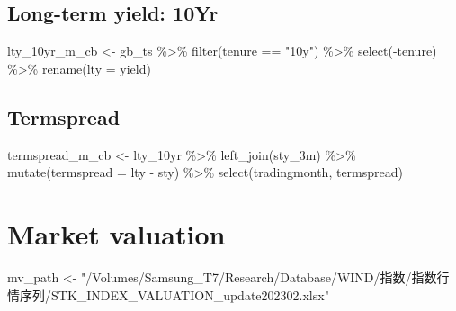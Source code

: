 \documentclass[
]{article}
\newenvironment{Shaded}{\begin{snugshade}}{\end{snugshade}}
\newcommand{\AttributeTok}[1]{\textcolor[rgb]{0.77,0.63,0.00}{#1}}
\newcommand{\FunctionTok}[1]{\textcolor[rgb]{0.00,0.00,0.00}{#1}}
\newcommand{\NormalTok}[1]{#1}
\newcommand{\OtherTok}[1]{\textcolor[rgb]{0.56,0.35,0.01}{#1}}
\newcommand{\SpecialCharTok}[1]{\textcolor[rgb]{0.00,0.00,0.00}{#1}}
\newcommand{\StringTok}[1]{\textcolor[rgb]{0.31,0.60,0.02}{#1}}
\begin{document}
\hypertarget{long-term-yield-10yr}{%
\subsection{Long-term yield: 10Yr}\label{long-term-yield-10yr}}

\begin{Shaded}
\begin{Highlighting}[]
\NormalTok{lty\_10yr\_m\_cb }\OtherTok{\textless{}{-}}\NormalTok{ gb\_ts }\SpecialCharTok{\%\textgreater{}\%} 
  \FunctionTok{filter}\NormalTok{(tenure }\SpecialCharTok{==} \StringTok{"10y"}\NormalTok{) }\SpecialCharTok{\%\textgreater{}\%} 
  \FunctionTok{select}\NormalTok{(}\SpecialCharTok{{-}}\NormalTok{tenure) }\SpecialCharTok{\%\textgreater{}\%} 
  \FunctionTok{rename}\NormalTok{(}\AttributeTok{lty =}\NormalTok{ yield)}
\end{Highlighting}
\end{Shaded}

\hypertarget{termspread}{%
\subsection{Termspread}\label{termspread}}

\begin{Shaded}
\begin{Highlighting}[]
\NormalTok{termspread\_m\_cb }\OtherTok{\textless{}{-}}\NormalTok{ lty\_10yr }\SpecialCharTok{\%\textgreater{}\%} 
  \FunctionTok{left\_join}\NormalTok{(sty\_3m) }\SpecialCharTok{\%\textgreater{}\%} 
  \FunctionTok{mutate}\NormalTok{(}\AttributeTok{termspread =}\NormalTok{ lty }\SpecialCharTok{{-}}\NormalTok{ sty) }\SpecialCharTok{\%\textgreater{}\%} 
  \FunctionTok{select}\NormalTok{(tradingmonth, termspread)}
\end{Highlighting}
\end{Shaded}

\hypertarget{market-valuation}{%
\section{Market valuation}\label{market-valuation}}

\begin{Shaded}
\begin{Highlighting}[]
\NormalTok{mv\_path }\OtherTok{\textless{}{-}} \StringTok{"/Volumes/Samsung\_T7/Research/Database/WIND/指数/指数行情序列/STK\_INDEX\_VALUATION\_update202302.xlsx"}
\end{Highlighting}
\end{Shaded}
\end{document}
